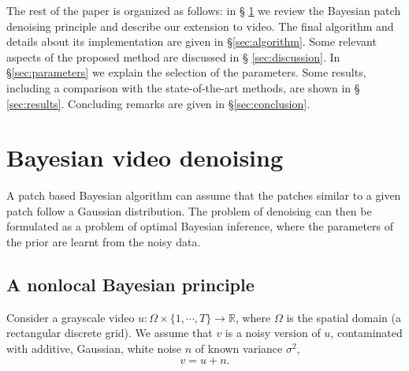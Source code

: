 \documentclass[10pt, journal, twocolumn, final, a4paper]{IEEEtran}
\newcommand{\ma}[1]{\boldsymbol{#1}}
\newcommand{\ie}{\emph{i.e}. } \newcommand{\Ie}{\emph{I.e}. }
\begin{document}
\bigskip

The rest of the paper is organized as follows: in \S
\ref{sec:review_nonlocal_Bayes} we review the Bayesian patch denoising principle 
and describe our extension to video. The final algorithm and details about its
implementation are given in \S \ref{sec:algorithm}.
Some relevant aspects of the proposed method are discussed in \S
\ref{sec:discussion}.
In \S \ref{sec:parameters}
we explain the selection of the parameters. Some results, including a
comparison with the state-of-the-art methods, are shown in \S
\ref{sec:results}. Concluding remarks are given in \S \ref{sec:conclusion}.

\section{Bayesian video denoising}
\label{sec:review_nonlocal_Bayes}

A patch based Bayesian algorithm can assume that the patches similar to a given
patch follow a Gaussian distribution.
The problem 
of denoising can then be formulated as a problem of optimal Bayesian inference, where the
parameters of the prior are learnt from the noisy data.

%



\subsection{A nonlocal Bayesian principle}

Consider a grayscale video $u:\Omega\times \{1,\cdots,T\}\rightarrow
\mathbb R$, where $\Omega$ is the spatial domain (a rectangular discrete grid).
We assume that $v$ is a noisy version of $u$, contaminated with additive,
Gaussian, white noise $n$ of known variance $\sigma^2$,
\[v = u + n.\]
\end{document}
